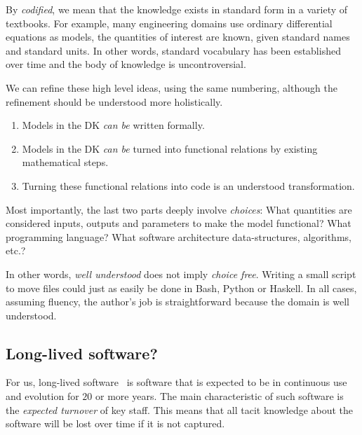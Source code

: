 \documentclass[a4paper,UKenglish,cleveref,autoref,thm-restate]{oasics-v2021}
\begin{document}
By \emph{codified}, we mean that the knowledge exists in standard form in a
variety of textbooks. For example, many engineering domains use ordinary
differential equations as models, the quantities of interest are known, given
standard names and standard units. In other words, standard vocabulary has been
established over time and the body of knowledge is uncontroversial.

We can refine these high level ideas, using the same numbering, although the
refinement should be understood more holistically.
\begin{enumerate}
\item Models in the DK \emph{can be} written formally.
\item Models in the DK \emph{can be} turned into functional relations by
 existing mathematical steps.
\item Turning these functional relations into code is an understood
 transformation.
\end{enumerate}
Most importantly, the last two parts deeply involve \emph{choices}: What
quantities are considered inputs, outputs and parameters to make the model
functional? What programming language?  What software architecture
data-structures, algorithms, etc.?

In other words, \emph{well understood} does not imply \emph{choice free}.
Writing a small script to move files could just as easily be done in Bash,
Python or Haskell. In all cases, assuming fluency, the author's job is
straightforward because the domain is well understood.

\subsection{Long-lived software?}
\label{subsec:long-lived-software}

For us, long-lived software~\cite{SPL-long-lived} is software that is expected
to be in continuous use and evolution for \(20\) or more years. The main
characteristic of such software is the \emph{expected turnover} of key staff.
This means that all tacit knowledge about the software will be lost over time if
it is not captured.

%
%
\end{document}
